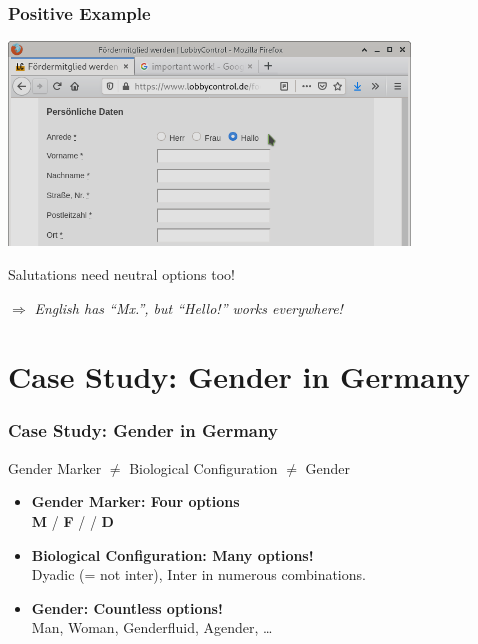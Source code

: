 \documentclass[aspectratio=169,x11names]{beamer}
\begin{document}
\begin{frame}
\frametitle{Positive Example}
\begin{center}
\includegraphics[width=0.8\textwidth,keepaspectratio]{images/lobbycontrol.png} 
\end{center}
\end{frame}

\begin{frame}
\begin{center}
\huge
Salutations need neutral options too!
\medskip

\Large
$\Rightarrow$ \emph{English has ``Mx.'', but ``Hello!'' works everywhere!}
\end{center}
\end{frame}

\section*{Case Study: Gender in Germany}

\begin{frame}
\frametitle{Case Study: Gender in Germany}

\begin{center}
Gender Marker \hfill $\neq$ \hfill Biological Configuration \hfill $\neq$ \hfill Gender \hspace*{30px}
\end{center}
\bigskip

\begin{itemize}
\item \textbf{Gender Marker: Four options}\\
\textbf{M} / \textbf{F} / \;\; / \textbf{D}\medskip

\item \textbf{Biological Configuration: Many options!}\\
Dyadic (= not inter), Inter in numerous combinations.
\medskip

\item \textbf{Gender: Countless options!}\\
Man, Woman, Genderfluid, Agender, \dots 
\end{itemize}

\end{frame}
\end{document}
